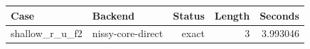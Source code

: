 {\small
\begin{tabular}{llrrr}
\hline
Case & Backend & Status & Length & Seconds \\
\hline
shallow\_r\_u\_f2 & nissy-core-direct & exact & 3 & 3.993046 \\
\hline
\end{tabular}
}
